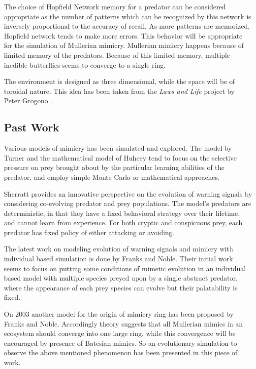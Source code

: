 \documentclass[letterpaper]{article}
\numberwithin{equation}{section}
\begin{document}
The choice of Hopfield Network memory for a predator can be considered appropriate as the number of patterns which can be recognized by this network is inversely proportional to the accuracy of recall. As more patterns are memorized, Hopfield network tends to make more errors. This behavior will be appropriate for the simulation of Mullerian mimicry. Mullerian mimicry happens because of limited memory of the predators. Because of this limited memory, multiple inedible butterflies seems to converge to a single ring.

The environment is designed as three dimensional, while the space will be of toroidal nature. This idea has been taken from the \textsl{Laws and Life} project by Peter Grogono \cite{grogono2003}.

\subsection{Past Work}
Various models of mimicry has been simulated and explored. The model by Turner \cite{turner1996} and the mathematical model of Huheey \cite{huheey1988} tend to focus on the selective pressure on prey brought about by the particular learning abilities of the predator, and employ simple Monte Carlo or mathematical approaches.

Sherratt \cite{sherratt2002} provides an innovative perspective on the evolution of warning signals by considering co-evolving predator and prey populations. The model's predators are deterministic, in that they have a fixed behavioral strategy over their lifetime, and cannot learn from experience. For both cryptic and conspicuous prey, each predator has fixed policy of either attacking or avoiding.

The latest work on modeling evolution of warning signals and mimicry with individual based simulation is done by Franks and Noble. Their initial work \cite{franks2002} seems to focus on putting some conditions of mimetic evolution in an individual based model with multiple species preyed upon by a single abstract predator, where the appearance of each prey species can evolve but their palatability is fixed.

On 2003 \cite{franks2003} another model for the origin of mimicry ring has been proposed by Franks and Noble. Accordingly theory suggests that all Mullerian mimics in an ecosystem should converge into one large ring, while this convergence will be encouraged by presence of Batesian mimics. So an evolutionary simulation to observe the above mentioned phenomenon has been presented in this piece of work.
\end{document}
